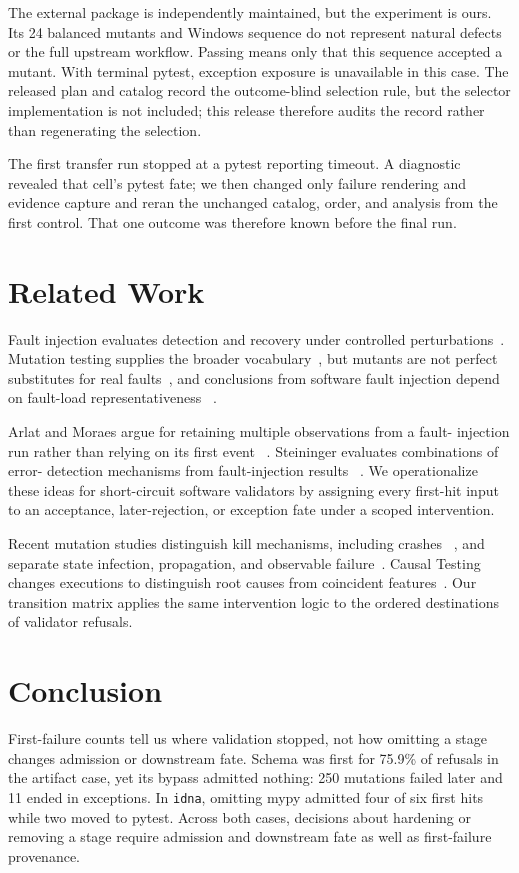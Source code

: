 \documentclass[11pt]{article}
\begin{document}
The external package is independently maintained, but the experiment is ours.
Its 24 balanced mutants and Windows sequence do not represent natural defects
or the full upstream workflow. Passing means only that this sequence accepted a
mutant. With terminal pytest, exception exposure is unavailable in this case.
The released plan and catalog record the outcome-blind selection rule, but the
selector implementation is not included; this release therefore audits the
record rather than regenerating the selection.

The first transfer run stopped at a pytest reporting timeout. A diagnostic
revealed that cell's pytest fate; we then changed only failure rendering and
evidence capture and reran the unchanged catalog, order, and analysis from the
first control. That one outcome was therefore known before the final run.

\section{Related Work}

Fault injection evaluates detection and recovery under controlled
perturbations~\cite{hsueh1997faultinjection}. Mutation testing supplies the
broader vocabulary~\cite{jia2011mutation}, but mutants are not perfect
substitutes for real faults~\cite{just2014mutants}, and conclusions from
software fault injection depend on fault-load representativeness
~\cite{natella2013representativeness}.

Arlat and Moraes argue for retaining multiple observations from a fault-
injection run rather than relying on its first event
~\cite{arlat2011collecting}. Steininger evaluates combinations of error-
detection mechanisms from fault-injection results
~\cite{steininger2002identifying}. We operationalize these ideas for
short-circuit software validators by assigning every first-hit input to an
acceptance, later-rejection, or exception fate under a scoped intervention.

Recent mutation studies distinguish kill mechanisms, including crashes
~\cite{du2023kill}, and separate state infection, propagation, and observable
failure~\cite{du2024ripples}. Causal Testing changes executions to distinguish
root causes from coincident features~\cite{johnson2020causal}. Our transition
matrix applies the same intervention logic to the ordered destinations of
validator refusals.

\section{Conclusion}

First-failure counts tell us where validation stopped, not how omitting a stage
changes admission or downstream fate. Schema was first for 75.9\% of refusals
in the artifact case, yet its bypass admitted nothing: 250 mutations failed
later and 11 ended in exceptions. In \texttt{idna}, omitting mypy admitted four of six first
hits while two moved to pytest. Across both cases, decisions about hardening or
removing a stage require admission and downstream fate as well as first-failure
provenance.

\clearpage
\printbibliography
\end{document}
